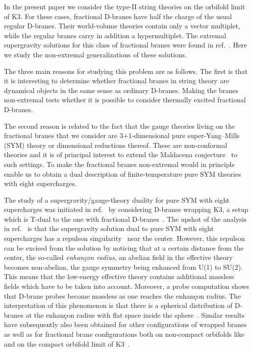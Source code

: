 \documentclass[a4paper,11pt]{article}
\providecommand{\ZZ}{\mathbb{Z}}  \providecommand{\Zint}{\mathbb{Z}}
\begin{document}
In the present paper we consider the type-II string theories on the
\myHighlight{$T^4\!/\ZZ_2$}\coordHE{} orbifold limit of K3. For these cases, fractional
D-branes have half the charge of the usual regular D-branes. Their
world-volume theories contain only a vector multiplet, while the
regular branes carry in addition a hypermultiplet. The extremal
supergravity solutions for this class of fractional branes were found
in ref.~\cite{Frau:2000gk}. Here we study the non-extremal
generalizations of these solutions.

The three main reasons for studying this problem are as follows. The
first is that it is interesting to determine whether fractional branes
in string theory are dynamical objects in the same sense as ordinary
D-branes. Making the branes non-extremal tests whether it is possible
to consider thermally excited fractional D-branes.

The second reason is related to the fact that the gauge theories
living on the fractional branes that we consider are 3+1-dimensional
pure \coordHE{} super-Yang--Mills (SYM) theory or dimensional
reductions thereof. These are non-conformal theories and it is of
principal interest to extend the Maldacena
conjecture~\cite{Maldacena:1997re,Gubser:1998bc,Witten:1998qj} to
such settings. To make the fractional branes non-extremal would in
principle enable us to obtain a dual description of finite-temperature
pure SYM theories with eight supercharges.

The study of a supergravity/gauge-theory duality for pure SYM with
eight supercharges was initiated in ref.~\cite{Johnson:1999qt} by
considering D-branes wrapping K3, a setup which is T-dual to the one
with fractional D-branes~\cite{Johnson:1999qt,Karch:1998yv,Dasgupta:1999wx}.
The upshot of the analysis in ref.~\cite{Johnson:1999qt} is that the
supergravity solution dual to pure SYM with eight supercharges has a
repulson singularity~\cite{Behrndt:1995tr,Kallosh:1995yz,Cvetic:1995mx}
near the center. However, this repulson can be excised from the solution
by noticing that at a certain distance from the center, the so-called
\emph{enhan\c{c}on radius}, an abelian field in the effective theory
becomes non-abelian, the gauge symmetry being enhanced from U(1) to
SU(2). This means that the low-energy effective theory contains
additional massless fields which have to be taken into account.
Moreover, a probe computation shows that D-brane probes become massless
as one reaches the enhan\c{c}on radius. The interpretation of this
phenomenon is that there is a spherical distribution of D-branes at
the enhan\c{c}on radius with flat space inside the
sphere~\cite{Johnson:1999qt}. Similar results have subsequently also
been obtained for other configurations of wrapped
branes~\cite{Gauntlett:2001ps,Bigazzi:2001aj,DiVecchia:2001uc} as well
as for fractional brane configurations both on non-compact orbifolds like
\coordHE{}~\cite{Bertolini:2000dk,Polchinski:2000mx,Grana:2001xn,
Bertolini:2001qa, Billo:2001vg,Bain:2001kw} and on the compact
\myHighlight{$T^4\!/\ZZ_2$}\coordHE{} orbifold limit of K3~\cite{Frau:2000gk}.
\end{document}
